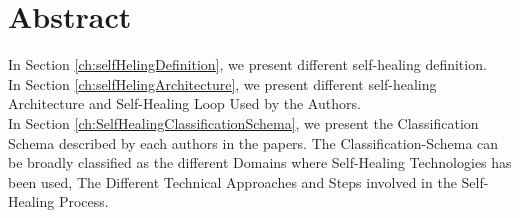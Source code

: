 \documentclass[a4paper,oneside]{scrreprt}
\begin{document}
\section*{Abstract}
In Section \ref{ch:selfHelingDefinition}, we present different self-healing definition.\\

In Section \ref{ch:selfHelingArchitecture}, we present different self-healing Architecture and Self-Healing Loop Used by the Authors.\\

In Section \ref{ch:SelfHealingClassificationSchema}, we present the Classification Schema described by each authors in the papers. The Classification-Schema can be broadly classified as the different Domains where Self-Healing Technologies has been used, The Different Technical Approaches and Steps involved in the Self-Healing Process.\\



\begin{versionhistory}  

 
\end{versionhistory}


\tableofcontents
\cleardoublepage













\end{document}
